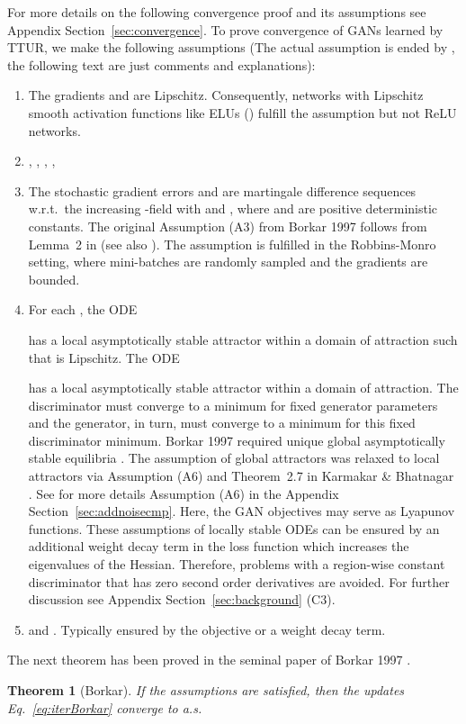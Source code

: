 \documentclass{article}
\newtheorem{theorem}{Theorem}
\begin{document}
For more details on the following convergence proof and its assumptions
see Appendix Section~\ref{sec:convergence}.
To prove convergence of GANs learned by TTUR, we make the following
assumptions (The actual assumption is ended by , the
following text are just comments and explanations):
\begin{enumerate}[label=\textbf{(A\arabic*)}]
\item The gradients  and   are Lipschitz. 
Consequently, networks with Lipschitz smooth activation functions like
ELUs () \cite{Clevert:16}
fulfill the assumption but not ReLU networks.
\item , ,
, , 
\item The stochastic gradient errors
 and  are martingale
difference sequences w.r.t.\ the increasing -field
 with
 and
, where  and  are positive deterministic
constants.
The original Assumption (A3) from Borkar 1997
follows from Lemma~2 in \cite{Bertsekas:00}
(see also \cite{Ramaswamy:16}).
The assumption is fulfilled in the
Robbins-Monro setting, where mini-batches are randomly
sampled and the gradients are bounded.
\item For each , the ODE

has a local asymptotically stable attractor
 within a domain of attraction 
such that  is Lipschitz.
The ODE

has a local asymptotically stable
attractor  within a domain of attraction.
The discriminator must converge
to a minimum for fixed generator parameters and
the generator, in turn, must converge to a minimum for this fixed discriminator
minimum.
Borkar 1997 required unique global asymptotically stable equilibria \cite{Borkar:97}.
The assumption of global attractors was relaxed to local attractors via
Assumption (A6) and Theorem~2.7
in Karmakar \& Bhatnagar \cite{Karmakar:17}.
See for more details Assumption (A6) in the Appendix
Section~\ref{sec:addnoisecmp}.
Here, the GAN objectives may serve as Lyapunov functions.
These assumptions of locally stable
ODEs can be ensured by an additional weight decay term in the loss function
which increases the eigenvalues of the Hessian. Therefore, problems with a
region-wise constant discriminator that has zero second order derivatives are
avoided. For further discussion see Appendix Section~\ref{sec:background}
(C3).
\item
 and .
Typically ensured by the objective or a weight decay term.
\end{enumerate}
The next theorem has been proved in the seminal paper of Borkar 1997 \cite{Borkar:97}.
\begin{theorem}[Borkar]
\label{th:borkar}
If the assumptions are satisfied,
then the updates Eq.~\eqref{eq:iterBorkar}
converge to  a.s.
\end{theorem}
\end{document}
